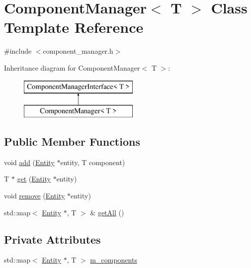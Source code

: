 \hypertarget{classComponentManager}{\section{Component\-Manager$<$ T $>$ Class Template Reference}
\label{classComponentManager}
}


{\ttfamily \#include $<$component\-\_\-manager.\-h$>$}

Inheritance diagram for Component\-Manager$<$ T $>$\-:\begin{figure}[H]
\begin{center}
\leavevmode
\includegraphics[height=2.000000cm]{classComponentManager}
\end{center}
\end{figure}
\subsection*{Public Member Functions}
\begin{DoxyCompactItemize}
\item 
void \hyperlink{classComponentManager_a47a5b1a0e0dcc81b602f2cce15ef26c1}{add} (\hyperlink{classEntity}{Entity} $\ast$entity, T component)
\item 
T $\ast$ \hyperlink{classComponentManager_ae0cecdacbc85227b566fd45620201d29}{get} (\hyperlink{classEntity}{Entity} $\ast$entity)
\item 
void \hyperlink{classComponentManager_aaed6a884b2e6be899d61858e35983bd8}{remove} (\hyperlink{classEntity}{Entity} $\ast$entity)
\item 
std\-::map$<$ \hyperlink{classEntity}{Entity} $\ast$, T $>$ \& \hyperlink{classComponentManager_afd23cc5da5ff3be1e4173fff6d5fddf4}{get\-All} ()
\end{DoxyCompactItemize}
\subsection*{Private Attributes}
\begin{DoxyCompactItemize}
\item 
std\-::map$<$ \hyperlink{classEntity}{Entity} $\ast$, T $>$ \hyperlink{classComponentManager_a807cc91da58969a861dca5fb604bd1b5}{m\-\_\-components}
\end{DoxyCompactItemize}


